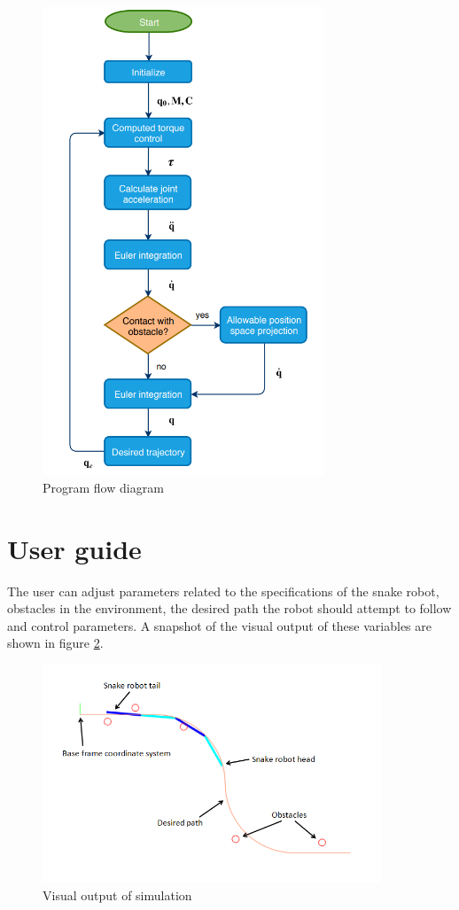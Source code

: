 \begin{figure}
    \centering
    \includegraphics[width=0.75\textwidth]{figures/sysflow.PNG}
    \caption{Program flow diagram}
    \label{fig:prog_flow}
\end{figure}


\section{User guide}

The user can adjust parameters related to the specifications of the snake robot, obstacles in the environment, the desired path the robot should attempt to follow and control parameters. A snapshot of the visual output of these variables are shown in figure \ref{fig:sim_vis}.

\begin{figure}
    \centering
    \includegraphics[width=0.9\textwidth]{figures/sim_vis.png}
    \caption{Visual output of simulation}
    \label{fig:sim_vis}
\end{figure}

